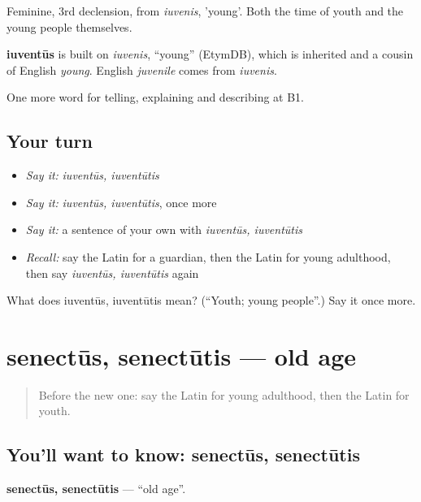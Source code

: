 Feminine, 3rd declension, from \emph{iuvenis}, 'young'. Both the time of youth and the young people themselves.

\begin{cousinweb}
\textbf{iuventūs} is built on \emph{iuvenis}, \textquotedblleft{}young\textquotedblright{} (EtymDB), which is inherited and a cousin of English \emph{young}. English \emph{juvenile} comes from \emph{iuvenis}.
\end{cousinweb}

\begin{grammarlens}[title={What you've built}]
One more word for telling, explaining and describing at B1.
\end{grammarlens}

\subsection*{Your turn}
\begin{itemize}
\raggedright
  \item \emph{Say it:} \emph{iuventūs, iuventūtis}
  \item \emph{Say it:} \emph{iuventūs, iuventūtis}, once more
  \item \emph{Say it:} a sentence of your own with \emph{iuventūs, iuventūtis}
  \item \emph{Recall:} say the Latin for a guardian, then the Latin for young adulthood, then say \emph{iuventūs, iuventūtis} again
\end{itemize}

\begin{tcolorbox}[breakable,colback=teal!4,colframe=teal!35!black,title={Before you move on}]
What does iuventūs, iuventūtis mean? (\textquotedblleft{}Youth; young people\textquotedblright{}.) Say it once more.
\end{tcolorbox}
\section[senectūs, senectūtis]{senectūs, senectūtis — old age}

\label{lesson:LA-C326-senectus}



\begin{quote}
Before the new one: say the Latin for young adulthood, then the Latin for youth.
\end{quote}

\subsection*{You'll want to know: senectūs, senectūtis}
\textbf{senectūs, senectūtis} — \textquotedblleft{}old age\textquotedblright{}.

